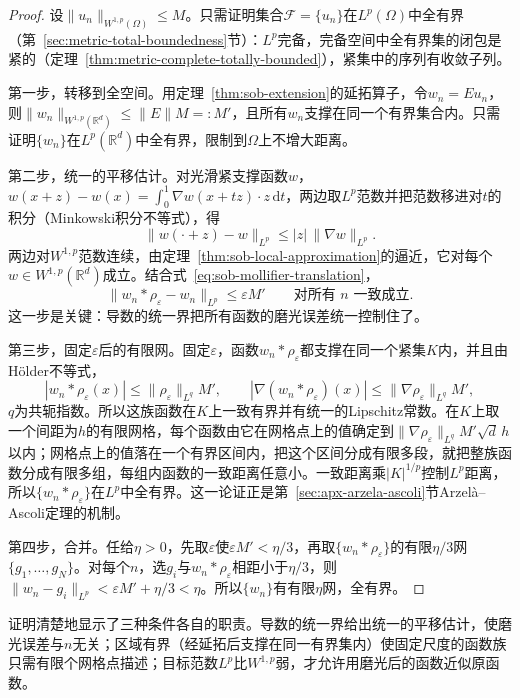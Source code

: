 \begin{proof}
设$\|u_n\|_{W^{1,p}(\Omega)}\le M$。只需证明集合$\mathcal F=\{u_n\}$在$L^p(\Omega)$中全有界（第~\ref{sec:metric-total-boundedness}节）：$L^p$完备，完备空间中全有界集的闭包是紧的（定理~\ref{thm:metric-complete-totally-bounded}），紧集中的序列有收敛子列。

第一步，转移到全空间。用定理~\ref{thm:sob-extension}的延拓算子，令$w_n=Eu_n$，则$\|w_n\|_{W^{1,p}(\mathbb R^d)}\le\|E\|M=:M'$，且所有$w_n$支撑在同一个有界集合内。只需证明$\{w_n\}$在$L^p(\mathbb R^d)$中全有界，限制到$\Omega$上不增大距离。

第二步，统一的平移估计。对光滑紧支撑函数$w$，$w(x+z)-w(x)=\int_0^1\nabla w(x+tz)\cdot z\,\mathrm dt$，两边取$L^p$范数并把范数移进对$t$的积分（Minkowski积分不等式），得
\[
 \|w(\cdot+z)-w\|_{L^p}\le|z|\,\|\nabla w\|_{L^p} .
\]
两边对$W^{1,p}$范数连续，由定理~\ref{thm:sob-local-approximation}的逼近，它对每个$w\in W^{1,p}(\mathbb R^d)$成立。结合式~\eqref{eq:sob-mollifier-translation}，
\[
 \|w_n*\rho_\varepsilon-w_n\|_{L^p}\le\varepsilon M'\qquad\text{对所有 }n\text{ 一致成立}.
\]
这一步是关键：导数的统一界把所有函数的磨光误差统一控制住了。

第三步，固定$\varepsilon$后的有限网。固定$\varepsilon$，函数$w_n*\rho_\varepsilon$都支撑在同一个紧集$K$内，并且由Hölder不等式，
\[
 |w_n*\rho_\varepsilon(x)|\le\|\rho_\varepsilon\|_{L^q}M',\qquad|\nabla(w_n*\rho_\varepsilon)(x)|\le\|\nabla\rho_\varepsilon\|_{L^q}M' ,
\]
$q$为共轭指数。所以这族函数在$K$上一致有界并有统一的Lipschitz常数。在$K$上取一个间距为$h$的有限网格，每个函数由它在网格点上的值确定到$\|\nabla\rho_\varepsilon\|_{L^q}M'\sqrt d\,h$以内；网格点上的值落在一个有界区间内，把这个区间分成有限多段，就把整族函数分成有限多组，每组内函数的一致距离任意小。一致距离乘$|K|^{1/p}$控制$L^p$距离，所以$\{w_n*\rho_\varepsilon\}$在$L^p$中全有界。这一论证正是第~\ref{sec:apx-arzela-ascoli}节Arzelà--Ascoli定理的机制。

第四步，合并。任给$\eta>0$，先取$\varepsilon$使$\varepsilon M'<\eta/3$，再取$\{w_n*\rho_\varepsilon\}$的有限$\eta/3$网$\{g_1,\ldots,g_N\}$。对每个$n$，选$g_i$与$w_n*\rho_\varepsilon$相距小于$\eta/3$，则$\|w_n-g_i\|_{L^p}<\varepsilon M'+\eta/3<\eta$。所以$\{w_n\}$有有限$\eta$网，全有界。
\end{proof}

证明清楚地显示了三种条件各自的职责。导数的统一界给出统一的平移估计，使磨光误差与$n$无关；区域有界（经延拓后支撑在同一有界集内）使固定尺度的函数族只需有限个网格点描述；目标范数$L^p$比$W^{1,p}$弱，才允许用磨光后的函数近似原函数。

